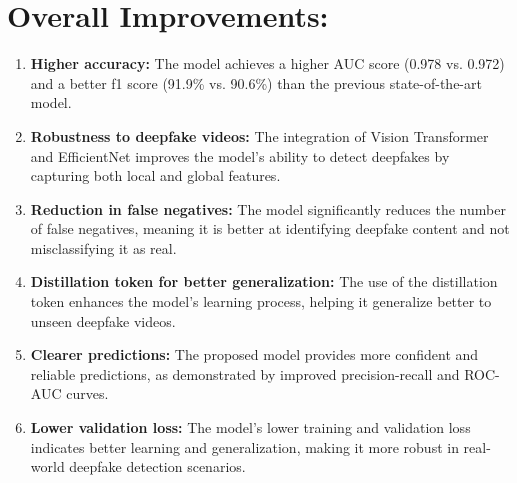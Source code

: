 \documentclass{report}
\begin{document}
	
	
	\section{Overall Improvements:}
	\begin{enumerate}
		\item 
		\textbf{Higher accuracy:} The model achieves a higher AUC score (0.978 vs. 0.972) and a better f1 score (91.9\% vs. 90.6\%) than the previous state-of-the-art model.
		
		\item 
		\textbf{Robustness to deepfake videos:} The integration of Vision Transformer and EfficientNet improves the model's ability to detect deepfakes by capturing both local and global features.
		
		\item 
		\textbf{Reduction in false negatives:} The model significantly reduces the number of false negatives, meaning it is better at identifying deepfake content and not misclassifying it as real.
		
		\item 
		\textbf{Distillation token for better generalization:} The use of the distillation token enhances the model's learning process, helping it generalize better to unseen deepfake videos.
		
		\item 
		\textbf{Clearer predictions:} The proposed model provides more confident and reliable predictions, as demonstrated by improved precision-recall and ROC-AUC curves.
		
		\item 
		\textbf{Lower validation loss:} The model's lower training and validation loss indicates better learning and generalization, making it more robust in real-world deepfake detection scenarios.
	\end{enumerate}
	
	
	
	
	
	
	
	
	
	
	
	
	
	
	
	
	\newpage
	
	
	
\end{document}
